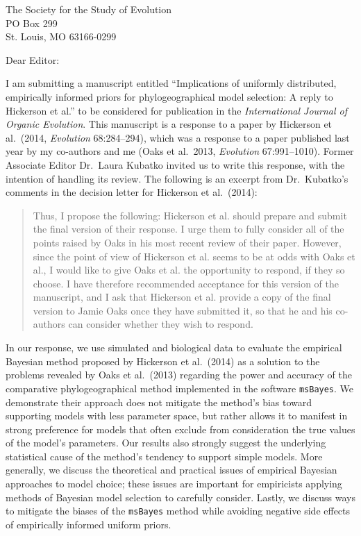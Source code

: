 \documentclass[letterpaper]{letter}
\begin{document}
\begin{letter}{The Society for the Study of Evolution \\
                     PO Box 299 \\
                     St. Louis, MO 63166-0299}
\opening{Dear Editor:}
I am submitting a manuscript entitled ``Implications of uniformly distributed,
empirically informed priors for phylogeographical model selection: A reply to
Hickerson et al.'' to be considered for publication in the \emph{International
Journal of Organic Evolution}.
This manuscript is a response to a paper by Hickerson et al.\ (2014,
\emph{Evolution} 68:284--294), which was a response to a paper published last
year by my co-authors and me (Oaks et al.\ 2013, \emph{Evolution}
67:991--1010).
Former Associate Editor Dr.\ Laura Kubatko invited us to write this response,
with the intention of handling its review.
The following is an excerpt from Dr.\ Kubatko's comments in the decision letter
for Hickerson et al.\ (2014):

\begin{quote}
Thus, I propose the following: Hickerson et al. should prepare and
submit the final version of their response.  I urge them to fully
consider all of the points raised by Oaks in his most recent review of their
paper. However, since the point of view of Hickerson et al. seems to
be at odds with Oaks et al., I would like to give Oaks et al. the opportunity
to respond, if they so choose. I have therefore recommended acceptance
for this version of the manuscript, and I ask that Hickerson et al. provide a
copy of the final version to Jamie Oaks once they have submitted it, so
that he and his co-authors can consider whether they wish to respond.
\end{quote}

In our response, we use simulated and biological data to evaluate the empirical
Bayesian method proposed by Hickerson et al.\ (2014) as a solution to the
problems revealed by Oaks et al.\ (2013) regarding the power and accuracy of the
comparative phylogeographical method implemented in the software
\texttt{msBayes}.
We demonstrate their approach does not mitigate the method's bias toward
supporting models with less parameter space, but rather allows it to manifest
in strong preference for models that often exclude from consideration the true
values of the model's parameters.
Our results also strongly suggest the underlying statistical cause of the
method's tendency to support simple models.
More generally, we discuss the theoretical and practical issues of empirical
Bayesian approaches to model choice; these issues are important for empiricists
applying methods of Bayesian model selection to carefully consider.
Lastly, we discuss ways to mitigate the biases of the \texttt{msBayes} method
while avoiding negative side effects of empirically informed uniform priors.


\end{letter}
\end{document}
